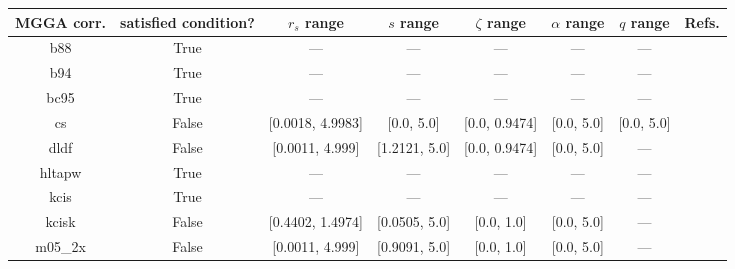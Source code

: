 \begin{tabular}{|c|c|c|c|c|c|c|l|}
\hline
   MGGA corr. &  satisfied condition? &      $r_s$ range &        $s$ range & $\zeta$ range & $\alpha$ range & $q$ range  &                                                                              Refs. \\ \hline
          b88 &                  True &              --- &              --- &           --- &            --- &        --- &                                                              \cite{Becke1988_1053} \\ \hline
          b94 &                  True &              --- &              --- &           --- &            --- &        --- &                                                               \cite{Becke1994_625} \\ \hline
         bc95 &                  True &              --- &              --- &           --- &            --- &        --- &                                                              \cite{Becke1996_1040} \\ \hline
           cs &                 False & [0.0018, 4.9983] &       [0.0, 5.0] & [0.0, 0.9474] &     [0.0, 5.0] & [0.0, 5.0] &                                                   \cite{Colle1975_329,Lee1988_785} \\ \hline
         dldf &                 False &  [0.0011, 4.999] &    [1.2121, 5.0] & [0.0, 0.9474] &     [0.0, 5.0] &        --- &                                                           \cite{Pernal2009_263201} \\ \hline
       hltapw &                  True &              --- &              --- &           --- &            --- &        --- &                                                             \cite{Lehtola2021_943} \\ \hline
         kcis &                  True &              --- &              --- &           --- &            --- &        --- & \cite{Rey1998_581,Krieger1999_463,Krieger2001_48,Kurth1999_889,Toulouse2002_10465} \\ \hline
        kcisk &                 False & [0.4402, 1.4974] &    [0.0505, 5.0] &    [0.0, 1.0] &     [0.0, 5.0] &        --- & \cite{Rey1998_581,Krieger1999_463,Krieger2001_48,Kurth1999_889,Toulouse2002_10465} \\ \hline
      m05\_2x &                 False &  [0.0011, 4.999] &    [0.9091, 5.0] &    [0.0, 1.0] &     [0.0, 5.0] &        --- &                                                                \cite{Zhao2006_364} \\ \hline

\end{tabular}
